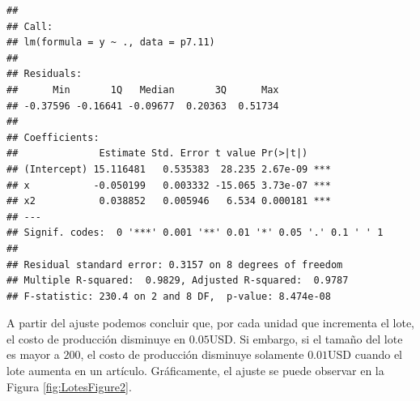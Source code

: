 \documentclass[
]{article}
\newenvironment{Shaded}{\begin{snugshade}}{\end{snugshade}}
\newcommand{\AttributeTok}[1]{\textcolor[rgb]{0.77,0.63,0.00}{#1}}
\newcommand{\DecValTok}[1]{\textcolor[rgb]{0.00,0.00,0.81}{#1}}
\newcommand{\FloatTok}[1]{\textcolor[rgb]{0.00,0.00,0.81}{#1}}
\newcommand{\FunctionTok}[1]{\textcolor[rgb]{0.00,0.00,0.00}{#1}}
\newcommand{\NormalTok}[1]{#1}
\newcommand{\OtherTok}[1]{\textcolor[rgb]{0.56,0.35,0.01}{#1}}
\newcommand{\SpecialCharTok}[1]{\textcolor[rgb]{0.00,0.00,0.00}{#1}}
\newcommand{\StringTok}[1]{\textcolor[rgb]{0.31,0.60,0.02}{#1}}
\begin{document}
\begin{verbatim}
## 
## Call:
## lm(formula = y ~ ., data = p7.11)
## 
## Residuals:
##      Min       1Q   Median       3Q      Max 
## -0.37596 -0.16641 -0.09677  0.20363  0.51734 
## 
## Coefficients:
##              Estimate Std. Error t value Pr(>|t|)    
## (Intercept) 15.116481   0.535383  28.235 2.67e-09 ***
## x           -0.050199   0.003332 -15.065 3.73e-07 ***
## x2           0.038852   0.005946   6.534 0.000181 ***
## ---
## Signif. codes:  0 '***' 0.001 '**' 0.01 '*' 0.05 '.' 0.1 ' ' 1
## 
## Residual standard error: 0.3157 on 8 degrees of freedom
## Multiple R-squared:  0.9829, Adjusted R-squared:  0.9787 
## F-statistic: 230.4 on 2 and 8 DF,  p-value: 8.474e-08
\end{verbatim}

A partir del ajuste podemos concluir que, por cada unidad que incrementa el lote, el costo de producción disminuye en \(0.05\)USD. Si embargo, si el tamaño del lote es mayor a \(200\), el costo de producción disminuye solamente \(0.01\)USD cuando el lote aumenta en un artículo. Gráficamente, el ajuste se puede observar en la Figura \ref{fig:LotesFigure2}.

\begin{Shaded}
\end{Shaded}
\end{document}
